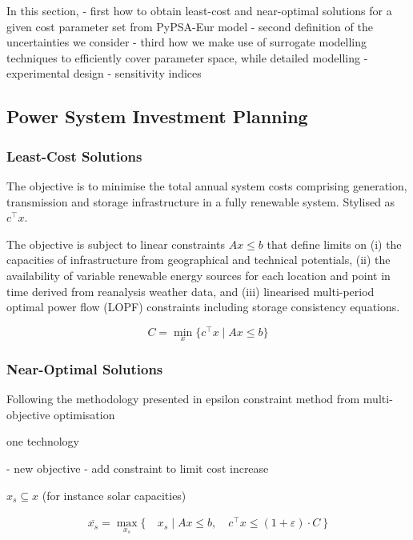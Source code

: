 In this section,
- first how to obtain least-cost and near-optimal solutions for a given cost parameter set from PyPSA-Eur model
- second definition of the uncertainties we consider
- third how we make use of surrogate modelling techniques to efficiently cover parameter space,
  while detailed modelling
- experimental design
- sensitivity indices

\subsection{Power System Investment Planning}
\label{sec:model}

\subsubsection{Least-Cost Solutions}

The objective is to minimise the total annual system costs comprising generation, transmission and storage infrastructure in a fully renewable system. Stylised as $c^\top x$.

The objective is subject to linear constraints $Ax\leq b$ that define limits on
(i) the capacities of infrastructure from geographical and technical potentials,
(ii) the availability of variable renewable energy sources for each location and point in time derived from reanalysis weather data, and
(iii) linearised multi-period optimal power flow (LOPF) constraints including storage consistency equations.

\begin{equation}
    C = \min_x\{c^\top x \mid Ax\leq b\}
\end{equation}

\subsubsection{Near-Optimal Solutions}

Following the methodology presented in \cite{nearoptimal}
epsilon constraint method from multi-objective optimisation \cite{mavrotas_effective_2009}

one technology

- new objective
- add constraint to limit cost increase

$x_s\subseteq x$ (for instance solar capacities)

\begin{align}
    \overline{x_s} = \max_{x_s}\{\:&x_s \mid Ax\leq b,\quad c^\top x\leq (1+\varepsilon)\cdot C \:\}
\end{align}

